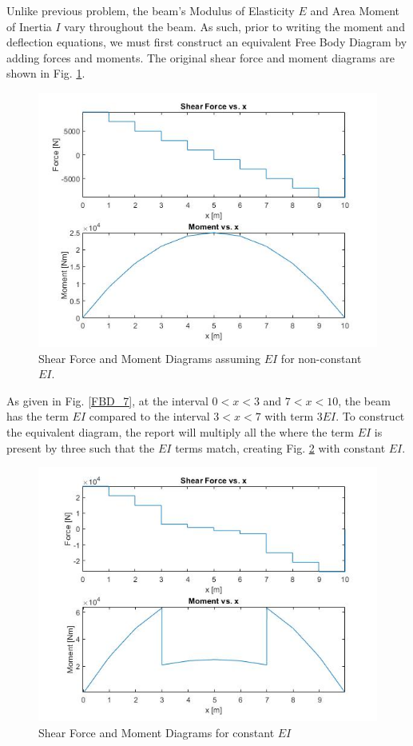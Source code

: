 \documentclass[a4paper]{article}
\begin{document}
Unlike previous problem, the beam's Modulus of Elasticity $E$ and Area Moment of Inertia $I$ vary throughout the beam. As such, prior to writing the moment and deflection equations, we must first construct an equivalent Free Body Diagram by adding forces and moments. The original shear force and moment diagrams are shown in Fig. \ref{noneq7}.

\begin{figure}[h]
\includegraphics[width=\textwidth]{results/noneq7.jpg}
\caption{Shear Force and Moment Diagrams assuming $EI$ for non-constant $EI$.}
\label{noneq7}
\end{figure}

As given in Fig. \ref{FBD_7}, at the interval $0<x<3$ and $7<x<10$, the beam has the term $EI$ compared to the interval $3<x<7$ with term $3EI$. To construct the equivalent diagram, the report will multiply all the where the term $EI$ is present by three such that the $EI$ terms match, creating Fig. \ref{eq7} with constant $EI$.

\begin{figure}[h]
\includegraphics[width=\textwidth]{results/eq7.jpg}
\caption{Shear Force and Moment Diagrams for constant $EI$}
\label{eq7}
\end{figure}
\end{document}
